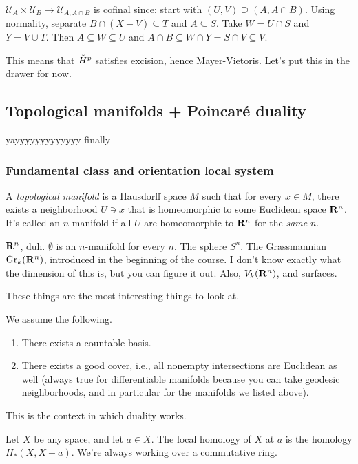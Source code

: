 $\mathcal{U}_A\times\mathcal{U}_B\to\mathcal{U}_{A,A\cap B}$ is cofinal since: start with $(U,V)\supseteq(A,A\cap B)$. Using normality, separate $B\cap(X-V)\subseteq T$ and $A\subseteq S$. Take $W=U\cap S$ and $Y=V\cup T$. Then $A\subseteq W\subseteq U$ and $A\cap B\subseteq W\cap Y=S\cap V\subseteq V$.

This means that $\check{H}^p$ satisfies excision, hence Mayer-Vietoris. Let's put this in the drawer for now.
\subsection{Topological manifolds + Poincar\'{e} duality}
yayyyyyyyyyyyyy finally
\subsubsection{Fundamental class and orientation local system}
\begin{definition}
A \emph{topological manifold} is a Hausdorff space $M$ such that for every $x\in M$, there exists a neighborhood $U\ni x$ that is homeomorphic to some Euclidean space $\mathbf R^n$. It's called an $n$-manifold if all $U$ are homeomorphic to $\mathbf R^n$ for the \emph{same} $n$.
\end{definition}
\begin{example}
$\mathbf R^n$, duh. $\emptyset$ is an $n$-manifold for every $n$. The sphere $S^n$. The Grassmannian $\mathrm{Gr}_k(\mathbf R^n)$, introduced in the beginning of the course. I don't know exactly what the dimension of this is, but you can figure it out. Also, $V_k(\mathbf R^n)$, and surfaces.
\end{example}
These things are the most interesting things to look at.
\begin{warning}
We assume the following.
\begin{enumerate}
\item There exists a countable basis.
\item There exists a good cover, i.e., all nonempty intersections are Euclidean as well (always true for differentiable manifolds because you can take geodesic neighborhoods, and in particular for the manifolds we listed above).
\end{enumerate}
\end{warning}
This is the context in which duality works.
\begin{definition}
Let $X$ be any space, and let $a\in X$. The local homology of $X$ at $a$ is the homology $H_\ast(X,X-a)$. We're always working over a commutative ring.
\end{definition}
